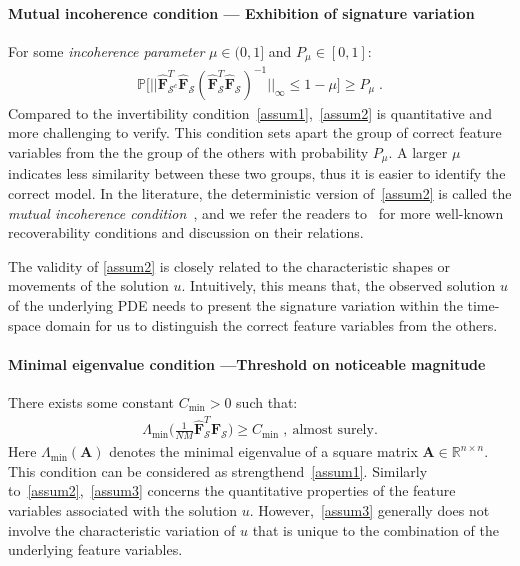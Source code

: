 \documentclass[a4paper,11pt]{article}
\newcommand{\bF}{\mathbf{F}}
\newcommand{\mS}{\mathcal{S}}
\begin{document}
\paragraph{Mutual incoherence condition --- Exhibition of signature variation} For some \textit{incoherence parameter} $\mu\in (0,1]$ and $P_\mu\in [0,1]$:
\begin{align}
\mathbb{P}\big[||\widehat{\bF}_{\mS^c}^T\widehat{\bF}_\mS(\widehat{\bF}_{\mS}^T\widehat{\bF}_\mS)^{-1}||_\infty\leq 1-\mu\big]\geq P_\mu\;.\label{assum2}\tag{A2}
\end{align}
Compared to the invertibility condition~\eqref{assum1},~\eqref{assum2} is  quantitative and more challenging to verify. This condition sets apart the group of correct feature variables from the the group of the others with probability $P_\mu$. A larger $\mu$ indicates less similarity between these two groups, thus it is easier to identify the correct model. In the literature, the deterministic version of~\eqref{assum2} is called the \textit{mutual incoherence condition}~\cite{fuchs2005recovery, tropp2006just,wainwright2009sharp}, and we refer the readers to~\cite{van2009conditions} for more well-known recoverability conditions and discussion on their relations.

The validity of \eqref{assum2} is closely related to the characteristic shapes or movements of the solution $u$. Intuitively, this means that, the observed solution $u$ of the underlying PDE needs to present the signature variation within the time-space domain for us to distinguish the correct feature variables from the others.
\paragraph{Minimal eigenvalue condition ---Threshold on noticeable magnitude} There exists some constant $C_{\min}>0$ such that:
\begin{align}
\Lambda_{\min}\Big(\frac{1}{NM}\widehat{\bF}_\mS^T\widehat{\bF}_\mS\Big)\geq C_{\min}\;,~\text{almost surely.}\label{assum3}\tag{A3}
\end{align}
Here $\Lambda_{\min}(\mathbf{A})$ denotes the minimal eigenvalue of a square matrix $\mathbf{A}\in\mathbb{R}^{n\times n}$. This condition can be considered as strengthend~\eqref{assum1}. Similarly to~\eqref{assum2},~\eqref{assum3} concerns the quantitative properties of the feature variables associated with the solution $u$. However,~\eqref{assum3} generally does not involve the characteristic variation of $u$ that is unique to the combination of the underlying feature variables.
\end{document}
